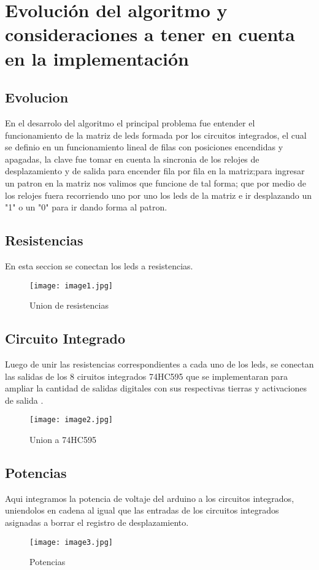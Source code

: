 \documentclass{article}
\begin{document}
\section{Evolución del algoritmo y consideraciones a tener en cuenta en la implementación}
\label{contenido}
\subsection{Evolucion}
En el desarrolo del algoritmo el principal problema fue entender el funcionamiento de la matriz de leds formada por los circuitos integrados, el cual se definio en un funcionamiento lineal de filas con posiciones encendidas y apagadas, la clave fue tomar en cuenta la sincronia de los relojes de desplazamiento y de salida para encender fila por fila en la matriz;para ingresar un patron en la matriz nos valimos que funcione de tal forma; que por medio de los relojes fuera recorriendo uno por uno los leds de la matriz e ir desplazando un "1" o un "0" para ir dando forma al patron.

\subsection{Resistencias}
En esta seccion se conectan los leds a resistencias.
    \begin{figure}[h]
    \centering
    \texttt{[image: image1.jpg]}
    \caption{Union de resistencias}
    \label{fig:image1}
    \end{figure}

\subsection{Circuito Integrado}
Luego de unir las resistencias correspondientes a cada uno de los leds, se conectan las salidas de los 8 ciruitos integrados 74HC595 que se implementaran para ampliar la cantidad de salidas digitales con sus respectivas tierras y activaciones de salida .
    \begin{figure}[h]
    \texttt{[image: image2.jpg]}
    \centering
    \caption{Union a 74HC595}
    \label{fig:image2}
    \end{figure}

\subsection{Potencias}
Aqui integramos la potencia de voltaje del arduino a los circuitos integrados, uniendolos en cadena al igual que las entradas de los circuitos integrados asignadas a borrar el registro de desplazamiento.
    \begin{figure}[h]
    \texttt{[image: image3.jpg]}
    \centering
    \caption{Potencias}
    \label{fig:image3}
    \end{figure}
\end{document}
